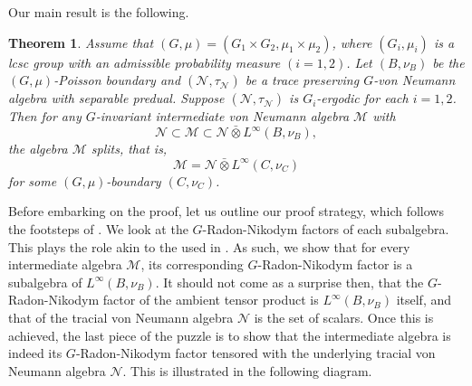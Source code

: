\documentclass[12pt]{amsart}
\newcommand{\cM}{{\mathcal M}}
\newcommand{\cN}{{\mathcal N}}
\newcommand{\RN}{{\rm RN}}
\newtheorem{thm}{Theorem}[section]
\theoremstyle{definition}
\begin{document}
Our main result is the following. 
\begin{thm}\label{thm:NC IFT}
Assume that $(G, \mu) = (G_1 \times G_2, \mu_1 \times \mu_2)$, where $(G_i,\mu_i)$ is a lcsc group with an admissible probability measure $(i=1,2)$.
Let $(B,\nu_B)$ be the $(G,\mu)$-Poisson boundary and $(\cN,\tau_\cN)$ be a trace preserving $G$-von Neumann algebra with separable predual. Suppose $(\cN, \tau_\cN)$ is $G_i$-ergodic for each $i=1,2$.  Then for any $G$-invariant intermediate von Neumann algebra $\cM$ with
\[
\cN \subset \cM \subset \cN\bar{\otimes}L^\infty(B, \nu_B),
\]
the algebra $\cM$ splits, that is,
$$\cM=\cN\bar{\otimes} L^\infty(C,\nu_C)$$
for some $(G,\mu)$-boundary $(C,\nu_C)$.
\end{thm}
Before embarking on the proof, let us outline our proof strategy, which follows the footsteps of \cite[Theorem~1.9]{BS06}. We look at the $G$-Radon-Nikodym factors of each subalgebra. This plays the role akin to the  used in \cite{BS06}. As such, we show that for every intermediate algebra $\cM$, its corresponding $G$-Radon-Nikodym factor is a subalgebra of $L^{\infty}(B,\nu_B)$. It should not come as a surprise then, that the $G$-Radon-Nikodym factor of the ambient tensor product is $L^{\infty}(B,\nu_B)$ itself, and that of the tracial von Neumann algebra $\cN$ is the set of scalars. Once this is achieved, the last piece of the puzzle is to show that the intermediate algebra is indeed its $G$-Radon-Nikodym factor tensored with the underlying tracial von Neumann algebra $\cN$. This is illustrated in the following diagram.
\begin{center}
\end{center}
\end{document}
